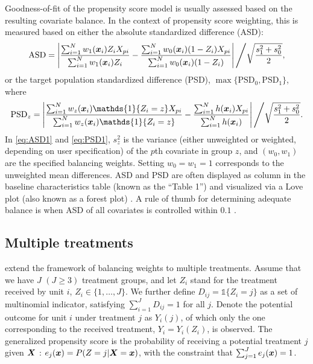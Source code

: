 Goodness-of-fit of the propensity score model is usually assessed based on the resulting covariate balance. In the context of propensity score weighting, this is  measured based on either the absolute standardized difference (ASD):
\begin{equation}\label{eq:ASD1}
\text{ASD} = \left| {\frac{\sum_{i=1}^N  w_1(\bm{x}_i)Z_iX_{pi} }{\sum_{i=1}^N w_1(\bm{x}_i)Z_i } - \frac{\sum_{i=1}^N  w_0(\bm{x}_i)(1- Z_i)X_{pi} }{\sum_{i=1}^N w_0(\bm{x}_i)(1-Z_i) }}\right|
\Bigg /{\sqrt{\frac{s_{1}^2 + s_{0}^2}{2}}},
\end{equation}
or the target population standardized difference (PSD), $\max\{\text{PSD}_0,\text{PSD}_1\}$, where
\begin{equation}\label{eq:PSD1}
\text{PSD}_z =
\left|{\frac{\sum_{i=1}^N  w_z(\bx_i)\mathds{1}\{Z_i=z\}X_{pi} }{\sum_{i=1}^N w_z(\bx_i)\mathds{1}\{Z_i=z\} } - \frac{\sum_{i=1}^N h(\bx_i)X_{pi} }{\sum_{i=1}^N h(\bx_i)}}\right|\Bigg /{\sqrt{\frac{s_{1}^2 + s_{0}^2}{2}}}.
\end{equation}
In \eqref{eq:ASD1} and \eqref{eq:PSD1}, $s_z^2$ is the variance (either unweighted or weighted, depending on user specification) of the $p$th covariate in group $z$, and $(w_0,w_1)$ are the specified balancing weights. Setting $w_0=w_1=1$ corresponds to the unweighted mean differences. ASD and PSD are often displayed as column in the baseline characteristics table (known as the ``Table 1'') and visualized via a Love plot (also known as a forest plot) \citep{Greifer}. A rule of thumb for determining adequate balance is when ASD of all covariates is controlled within $0.1$ \citep{austin2015moving}.


\subsection{Multiple treatments}
\label{sec:multiple}

\cite{li2019propensity} extend the framework of balancing weights to multiple treatments. Assume that we have $J$ $(J\geq 3)$ treatment groups, and let $Z_i$ stand for the treatment received by unit $i$, $Z_i\in \{1,\ldots,J\}$. We further define $D_{ij}=\mathds{1}\{Z_i=j\}$ as a set of multinomial indicator, satisfying $\sum_{i=1}^J D_{ij}=1$ for all $j$. Denote the potential outcome for unit $i$ under treatment $j$ as $Y_{i}(j)$, of which only the one corresponding to the received treatment, $Y_i=Y_i(Z_i)$, is observed. The generalized propensity score is the probability of receiving a potential treatment $j$ given $\bm{X}$ \citep{Imbens2000}: $e_j(\bm{x})=P(Z=j|\bm{X}=\bm{x})$, with the constraint that $\sum_{j=1}^J e_j(\bm{x})=1$.

